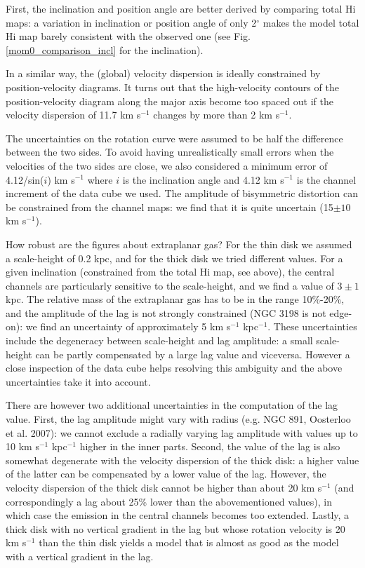 \documentclass[traditabstract]{aa}
\begin{document}
First, the inclination and position angle are better derived by
comparing total H{\sc i} maps: a
variation in inclination or position angle of only 2$^{\circ}$ makes
the model total H{\sc i} map barely consistent with the observed one
(see Fig. \ref{mom0_comparison_incl} for the inclination). 

In a
similar way, the (global) velocity dispersion is ideally constrained by
position-velocity diagrams. It turns out that the high-velocity
contours of the position-velocity diagram along the major axis become
too spaced out if the velocity dispersion of 11.7 km s$^{-1}$ changes
by more than 2 km s$^{-1}$.

The uncertainties on the rotation curve were assumed to be 
half the difference between the two sides. To avoid having
unrealistically small errors when the velocities of the two sides are
close, we also considered a minimum error of 4.12/sin($i$) km s$^{-1}$
where $i$ is the inclination angle and 4.12 km s$^{-1}$ is the channel
increment of the data cube we used. The amplitude of bisymmetric
distortion can be constrained from the 
channel maps: we find that it is quite uncertain (15$\pm 10$ km
s$^{-1}$).   

 

How robust are the figures about extraplanar gas? 
For
the thin disk we assumed a scale-height of 0.2 kpc, and for the thick
disk we tried different values. For a given inclination (constrained
from the total H{\sc i} map, see above), the central channels are particularly
sensitive to the scale-height, and we find a
value of $3\pm1$ kpc. 
The relative mass of the extraplanar gas has to be in the range
10\%-20\%, and the amplitude of the lag is not strongly constrained
(NGC 3198 is not edge-on): we find an uncertainty of approximately 5
km s$^{-1}$ kpc$^{-1}$. These uncertainties include the degeneracy between
scale-height and lag amplitude: a small scale-height can be partly
compensated by a large lag value and viceversa. However a close
inspection of the data cube helps resolving this ambiguity and the
above uncertainties take it into account. 

There are however two additional uncertainties in the computation of
the lag value. First, the lag amplitude might vary with radius
(e.g. NGC 891, Oosterloo et al. 2007): we cannot exclude a radially
varying lag amplitude with values up to 10 km s$^{-1}$ kpc$^{-1}$ higher in the
inner parts. Second, the value of the lag is also somewhat degenerate
with the velocity dispersion of the thick disk: a higher value of the
latter can be compensated by a lower value of the lag. However, the
velocity dispersion of the thick disk cannot be higher than about 20
km s$^{-1}$ (and correspondingly a lag about 25\% lower than the
abovementioned values), in which case the emission in the central
channels becomes too extended. Lastly, a thick disk with no vertical
gradient in the lag but whose rotation velocity is 20 km s$^{-1}$ than the
thin disk yields a model that is almost as good as the model with a
vertical gradient in the lag. 
\end{document}
